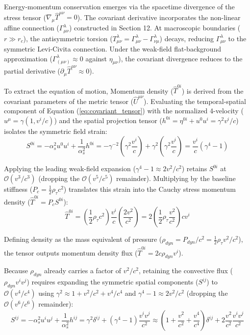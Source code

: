 Energy-momentum conservation emerges via the spacetime divergence of the stress tensor ($\nabla_\mu \hat{T}^{\mu\nu} = 0$). The covariant derivative incorporates the non-linear affine connection ($\Gamma^\lambda_{\mu\nu}$) constructed in Section 12. At macroscopic boundaries ($r \gg r_c$), the antisymmetric torsion ($T^\lambda_{\mu\nu} = \Gamma^\lambda_{\mu\nu} - \Gamma^\lambda_{\nu\mu}$) decays, reducing $\Gamma^\lambda_{\mu\nu}$ to the symmetric Levi-Civita connection. Under the weak-field flat-background approximation ($\Gamma^\lambda_{(\mu\nu)} \approx 0$ against $\eta_{\mu\nu}$), the covariant divergence reduces to the partial derivative ($\partial_\mu \hat{T}^{\mu\nu} \approx 0$). 

To extract the equation of motion, Momentum density ($\hat{T}^{0i}$) is derived from the covariant parameters of the metric tensor ($\hat{U}^{\mu\nu}$). Evaluating the temporal-spatial component of Equation (\ref{eq:covariant_tensor}) with the normalized 4-velocity ($u^\mu = \gamma(1, v^i/c)$) and the spatial projection tensor ($h^{0i} = \eta^{0i} + u^0 u^i = \gamma^2 v^i/c$) isolates the symmetric field strain:
\begin{equation}
    S^{0i} = -\alpha_s^2 u^0 u^i + \frac{1}{\alpha_s^2} h^{0i} = -\gamma^{-2}\left(\gamma^2 \frac{v^i}{c}\right) + \gamma^2\left(\gamma^2 \frac{v^i}{c}\right) = \frac{v^i}{c}(\gamma^4 - 1)
\end{equation}

Applying the leading weak-field expansion ($\gamma^4 - 1 \approx 2v^2/c^2$) retains $S^{0i}$ at $\mathcal{O}(v^3/c^3)$ (dropping the $\mathcal{O}(v^5/c^5)$ remainder). Multiplying by the baseline stiffness ($P_c = \frac{1}{2}\rho_\tau c^2$) translates this strain into the Cauchy stress momentum density ($\hat{T}^{0i} = P_c S^{0i}$):
\begin{equation}
    \hat{T}^{0i} = \left(\frac{1}{2}\rho_\tau c^2\right) \frac{v^i}{c} \left(\frac{2v^2}{c^2}\right) = 2\left(\frac{1}{2} \rho_\tau \frac{v^2}{c^2}\right) c v^i 
\end{equation}

Defining density as the mass equivalent of pressure ($\rho_{dyn} = P_{dyn}/c^2 = \frac{1}{2}\rho_\tau v^2/c^2$), the tensor outputs momentum density flux ($\hat{T}^{0i} = 2 c \rho_{dyn} v^i$). 

Because $\rho_{dyn}$ already carries a factor of $v^2/c^2$, retaining the convective flux ($\rho_{dyn} v^i v^j$) requires expanding the symmetric spatial components ($S^{ij}$) to $\mathcal{O}(v^4/c^4)$ using $\gamma^2 \approx 1 + v^2/c^2 + v^4/c^4$ and $\gamma^4 - 1 \approx 2v^2/c^2$ (dropping the $\mathcal{O}(v^6/c^6)$ remainder): 
\begin{equation}
    S^{ij} = -\alpha_s^2 u^i u^j + \frac{1}{\alpha_s^2} h^{ij} = \gamma^2\delta^{ij} + (\gamma^4 - 1)\frac{v^i v^j}{c^2} \approx \left(1 + \frac{v^2}{c^2} + \frac{v^4}{c^4}\right)\delta^{ij} + 2\frac{v^2}{c^2}\frac{v^i v^j}{c^2} 
\end{equation}

